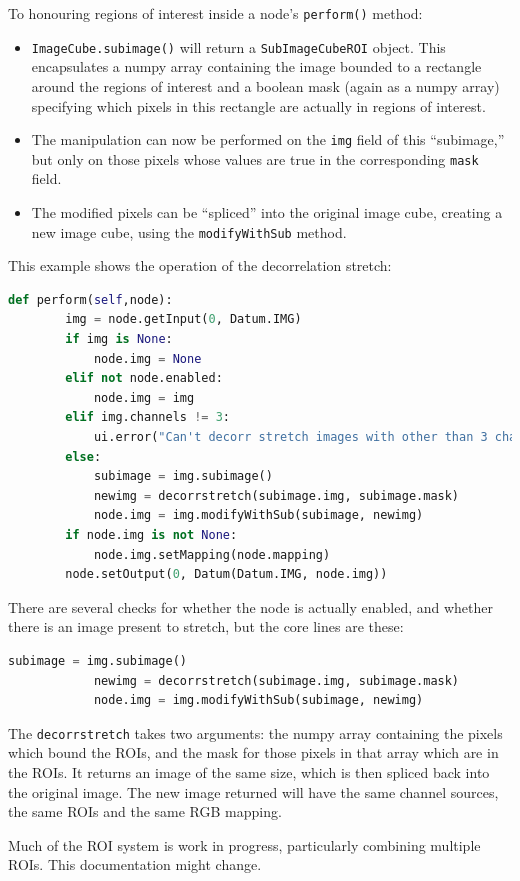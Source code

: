 To honouring regions of interest inside a node's \texttt{perform()} method:
\begin{itemize}
\item \texttt{ImageCube.subimage()} will return a \texttt{SubImageCubeROI} object. This encapsulates
a numpy array containing the image bounded to a rectangle around the regions of interest and
a boolean mask (again as a numpy array) specifying which pixels in this rectangle are actually
in regions of interest.
\item The manipulation can now be performed on the \texttt{img} field of this ``subimage,'' but
only on those pixels whose values are true in the corresponding \texttt{mask} field.
\item The modified pixels can be ``spliced'' into the original image cube, creating a new image
cube, using the \texttt{modifyWithSub} method.
\end{itemize}
This example shows the operation of the decorrelation stretch:
\begin{lstlisting}[language=Python]
    def perform(self,node):
        img = node.getInput(0, Datum.IMG)
        if img is None:
            node.img = None
        elif not node.enabled:
            node.img = img
        elif img.channels != 3:
            ui.error("Can't decorr stretch images with other than 3 channels")
        else:
            subimage = img.subimage()
            newimg = decorrstretch(subimage.img, subimage.mask)
            node.img = img.modifyWithSub(subimage, newimg)
        if node.img is not None:
            node.img.setMapping(node.mapping)
        node.setOutput(0, Datum(Datum.IMG, node.img))
\end{lstlisting}
There are several checks for whether the node is actually enabled, and whether there is an image
present to stretch, but the core lines are these:
\begin{lstlisting}[language=Python]
            subimage = img.subimage()
            newimg = decorrstretch(subimage.img, subimage.mask)
            node.img = img.modifyWithSub(subimage, newimg)
\end{lstlisting}
The \texttt{decorrstretch} takes two arguments: the numpy array containing the pixels which bound
the ROIs, and the mask for those pixels in that array which are in the ROIs. It returns an image
of the same size, which is then spliced back into the original image. The new image returned
will have the same channel sources, the same ROIs and the same RGB mapping.

\begin{notebox}
Much of the ROI system is work in progress, particularly combining
multiple ROIs. This documentation might change.
\end{notebox}

